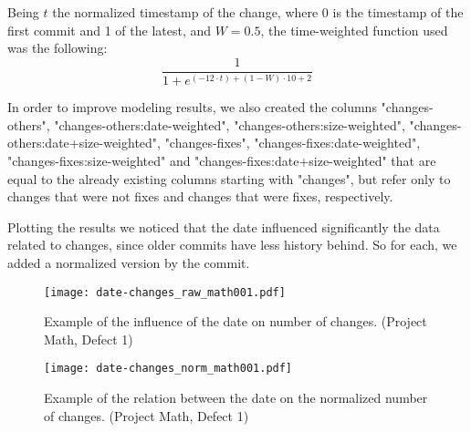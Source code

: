 Being $t$ the normalized timestamp of the change, where 0 is the timestamp of the first commit and 1 of the latest, and $W = 0.5$, the time-weighted function used was the following:
%
\begin{equation}
  \frac {1} {1 + e^{(-12 \cdot t) + (1 - W) \cdot 10 + 2}}
\end{equation}

In order to improve modeling results, we also created the columns "changes-others", "changes-others:date-weighted", "changes-others:size-weighted", "changes-others:date+size-weighted", 
"changes-fixes", "changes-fixes:date-weighted", "changes-fixes:size-weighted" and "changes-fixes:date+size-weighted" that are equal to the already existing columns starting with
"changes", but refer only to changes that were not fixes and changes that were fixes, respectively.

Plotting the results we noticed that the date influenced significantly the data related to changes, since older commits have less history behind. 
So for each, we added a normalized version by the commit.

\begin{figure}[ht]
  \begin{center}
    \leavevmode
    \texttt{[image: date-changes\_raw\_math001.pdf]}
    \caption{Example of the influence of the date on number of changes. (Project Math, Defect 1)}
    \label{fig:date-changes.raw}
  \end{center}
\end{figure}

\begin{figure}[ht]
  \begin{center}
    \leavevmode
    \texttt{[image: date-changes\_norm\_math001.pdf]}
    \caption{Example of the relation between the date on the normalized number of changes. (Project Math, Defect 1)}
    \label{fig:date-changes.norm}
  \end{center}
\end{figure}

